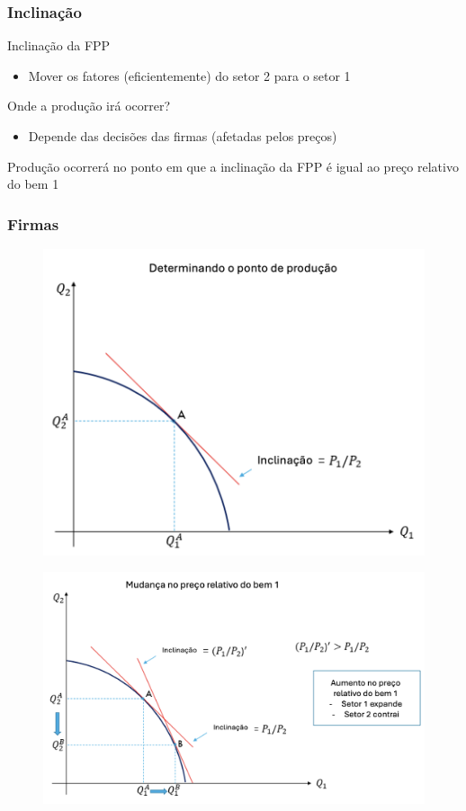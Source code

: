 \documentclass[a4paper,12pt]{article}[abntex2]
\begin{document}
\subsubsection{\textbf{Inclinação}}
Inclinação da FPP
\begin{itemize}
    \item Mover os fatores (eficientemente) do setor 2 para o setor 1
\end{itemize}

Onde a produção irá ocorrer?
\begin{itemize}
    \item Depende das decisões das firmas (afetadas pelos preços)
\end{itemize}

Produção ocorrerá no ponto em que a inclinação da FPP é igual ao preço relativo do bem 1

\subsubsection{\textbf{Firmas}}
\begin{figure}[H]
    \centering
    \includegraphics[width=0.7\linewidth]{Imagens/a12i2.png}
\end{figure}

\begin{figure}[H]
    \centering
    \includegraphics[width=0.7\linewidth]{Imagens/a12i3.png}
\end{figure}
\end{document}
